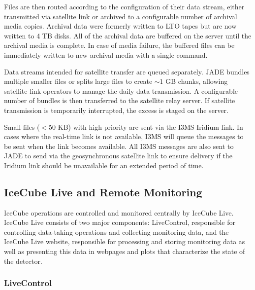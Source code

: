 Files are then routed according to the configuration of their
data stream, either transmitted via satellite link or 
archived to a configurable number of archival media copies.  Archival data
were formerly written to LTO tapes but are now written to 4 TB disks.
All of the archival data are buffered on the server until the archival media
is complete. In case of media failure, the buffered files can be 
immediately written to new archival media with a single command.

Data streams intended for satellite transfer are queued separately.  
JADE bundles multiple smaller files or splits large files to create $\sim1$
GB chunks, allowing satellite link operators to manage the daily data
transmission.  A configurable number of bundles is then transferred to the
satellite relay server.  If satellite transmission is temporarily
interrupted, the excess is staged on the server. 

Small files ($<$50 KB) with high priority are sent via
the I3MS Iridium link.  In cases where the real-time link is not available, I3MS
will queue the messages to be sent when the link becomes available. All
I3MS messages are also sent to JADE to send via the geosynchronous satellite link to
ensure delivery if the Iridium link should be unavailable for an extended
period of time.

\subsection{\label{sec:online:icecubelive}IceCube Live and Remote Monitoring}

IceCube operations are controlled and monitored centrally by IceCube Live.
IceCube Live consists of two major components: LiveControl,
responsible for controlling data-taking operations and collecting
monitoring data, and the IceCube Live website, responsible for processing
and storing monitoring data as well as presenting this data in webpages and
plots that characterize the state of the detector.

\subsubsection{LiveControl}

